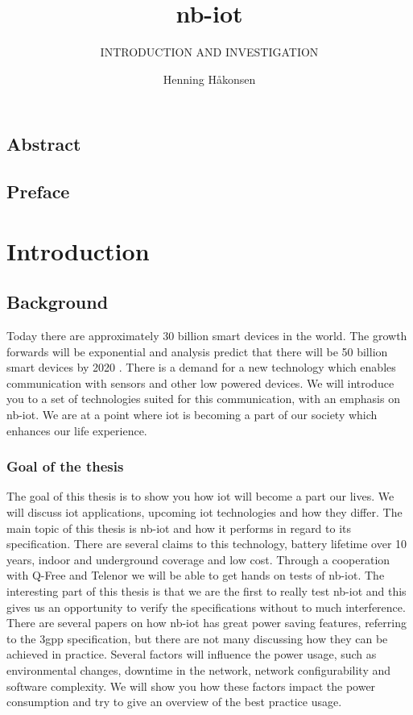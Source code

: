 \documentclass[USenglish]{ifimaster}  %
\title{\acrlong{nb-iot}}        %
\subtitle{INTRODUCTION AND INVESTIGATION}         %
\author{Henning Håkonsen}             %
\begin{document}
\duoforside[dept={Department of Informatics},   %
  program={Network and system administration},  %
  long]                                        %

\frontmatter{}
\chapter*{Abstract}                   %

\tableofcontents{}
\listoffigures{}
\listoftables{}

\chapter*{Preface}                    %

\mainmatter{}
\part{Introduction}                   %

\chapter{Background}                  %
Today there are approximately 30 billion smart devices in the world. The growth forwards will be exponential and analysis predict that there will be 50 billion smart devices by 2020 \cite{online:IoT2020}. There is a demand for a new technology which enables communication with sensors and other low powered devices. We will introduce you to a set of technologies suited for this communication, with an emphasis on \acrfull{nb-iot}. We are at a point where \acrshort{iot} is becoming a part of our society which enhances our life experience.

\section{Goal of the thesis}
The goal of this thesis is to show you how \acrshort{iot} will become a part our lives. We will discuss \acrshort{iot} applications, upcoming \acrshort{iot} technologies and how they differ. The main topic of this thesis is \acrshort{nb-iot} and how it performs in regard to its specification. There are several claims to this technology, battery lifetime over 10 years, indoor and underground coverage and low cost. Through a cooperation with Q-Free and Telenor we will be able to get hands on tests of \acrshort{nb-iot}. The interesting part of this thesis is that we are the first to really test \acrshort{nb-iot} and this gives us an opportunity to verify the specifications without to much interference. There are several papers on how \acrshort{nb-iot} has great power saving features, referring to the \acrshort{3gpp} specification, but there are not many discussing how they can be achieved in practice. Several factors will influence the power usage, such as environmental changes, downtime in the network, network configurability and software complexity. We will show you how these factors impact the power consumption and try to give an overview of the best practice usage.
\end{document}
